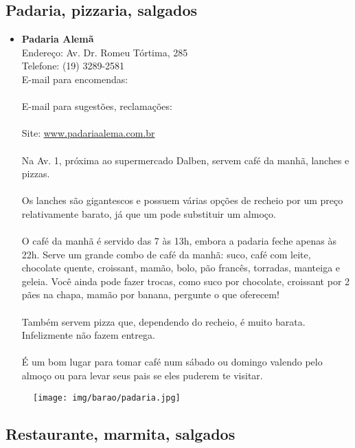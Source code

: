 \subsection{Padaria, pizzaria, salgados}

\begin{itemize}
\item \textbf{Padaria Alemã}
  \\Endereço: Av. Dr. Romeu Tórtima, 285
  \\Telefone: (19) 3289-2581
  \\E-mail para encomendas:\\
  \\E-mail para sugestões, reclamações:\\
  \\Site: \url{www.padariaalema.com.br}
  \\
  \\Na Av. 1, próxima ao supermercado Dalben, servem café da manhã, lanches e
  pizzas.
  \\
  \\Os lanches são gigantescos e possuem várias opções de recheio por um preço
  relativamente barato, já que um pode substituir um almoço.
  \\
  \\O café da manhã é servido das 7 às 13h, embora a padaria feche apenas às
  22h. Serve um grande combo de café da manhã: suco, café com leite, chocolate
  quente, croissant, mamão, bolo, pão francês, torradas, manteiga e geleia.
  Você ainda pode fazer trocas, como suco por chocolate, croissant por 2 pães
  na chapa, mamão por banana, pergunte o que oferecem!
  \\
  \\Também servem pizza que, dependendo do recheio, é muito barata.
  Infelizmente não fazem entrega.
  \\
  \\É um bom lugar para tomar café num sábado ou domingo valendo pelo almoço ou
  para levar seus pais se eles puderem te visitar.
\end{itemize}

\begin{figure}[h!]
  \centering
  \texttt{[image: img/barao/padaria.jpg]}
\end{figure}

\subsection{Restaurante, marmita, salgados}

